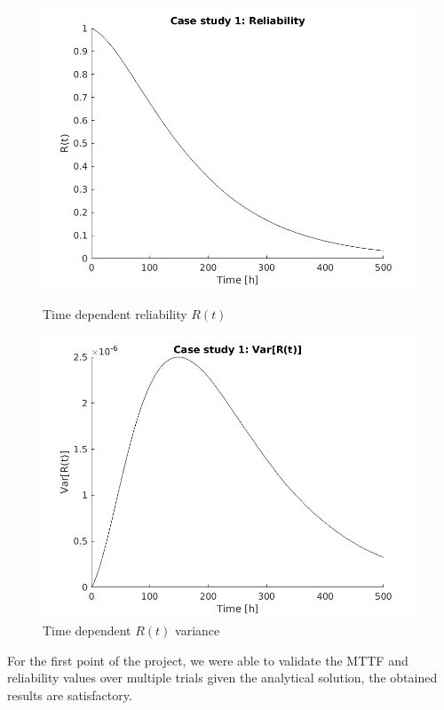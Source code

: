 \documentclass[a4paper,11pt]{article}
\begin{document}
\begin{figure}[ht]
    \centering
    \begin{minipage}{.5\textwidth}
        \centering
        \includegraphics[width=1\linewidth]{Rel1.png}
        \caption{Time dependent reliability $R(t)$}
    \end{minipage}%
    \begin{minipage}{.5\textwidth}
        \centering
        \includegraphics[width=1\linewidth]{Rel1_var.png}
        \caption{Time dependent $R(t)$ variance}
    \end{minipage}
\end{figure}

For the first point of the project, we were able to validate the MTTF and
reliability values over multiple trials given the analytical solution, the
obtained results are satisfactory.
\end{document}
